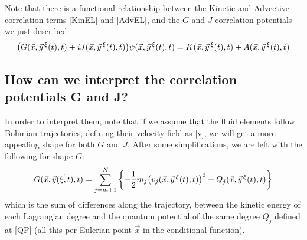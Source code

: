 \documentclass[11pt, a4paper]{article} %
\begin{document}
Note that there is a functional relationship between the Kinetic and Advective correlation terms \eqref{KinEL} and \eqref{AdvEL}, and the $G$ and $J$ correlation potentials we just described: 
\begin{equation}
\qty(G(\vec{x}, \vec{y}^{\, \xi}(t),t)+iJ(\vec{x}, \vec{y}^{\, \xi}(t),t))\psi(\vec{x}, \vec{y}^{\, \xi}(t),t)=K(\vec{x}, \vec{y}^{\, \xi}(t),t)+A(\vec{x}, \vec{y}^{\, \xi}(t),t)\vspace{-0.2cm}
\end{equation}
\subsection*{How can we interpret the correlation potentials G and J?}
In order to interpret them, note that if we assume that the fluid elements follow Bohmian trajectories, defining their velocity field as \eqref{v}, we will get a more appealing shape for both $G$ and $J$. After some simplifications, we are left with the following for shape $G$:
\begin{equation}\label{G.Bohm}
G(\vec{x},\vec{y}(\vec{\xi},t),t)=\sum_{j=m+1}^N\qty{-\frac{1}{2}m_j\qty(v_j(\vec{x},\vec{y}^{\, \xi}(t),t))^2+Q_j(\vec{x},\vec{y}^{\, \xi}(t),t)}
\end{equation}
which is the sum of differences along the trajectory, between the kinetic energy of each Lagrangian degree and the quantum potential of the same degree $Q_j$ defined at \eqref{QP} (all this per Eulerian point $\vec{x}$ in the conditional function).
\end{document}
